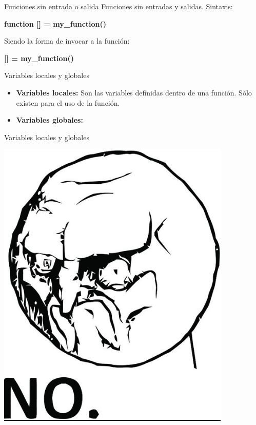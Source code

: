 \documentclass{bredelebeamer}
\begin{document}
\begin{frame}{Funciones sin entrada o salida}
Funciones sin entradas y salidas. Sintaxis:\\
\begin{center}
\textbf{function [] = my\_function()}
\end{center}
Siendo la forma de invocar a la función:
\begin{center}
\textbf{[] = my\_function()}
\end{center}
\end{frame}

\begin{frame}{Variables locales y globales}
\begin{itemize}
\item \textbf{Variables locales:} Son las variables definidas dentro de una función. Sólo existen para el uso de la función.
\item \textbf{Variables globales:} 
\end{itemize}
\end{frame}

\begin{frame}{Variables locales y globales}
\begin{center}
\includegraphics[scale=0.4]{images/img41.png}
\end{center}
\end{frame}
\end{document}
